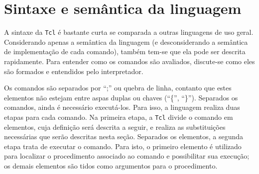 

\section{Sintaxe e semântica da linguagem}

A sintaxe da \texttt{Tcl} é bastante curta se comparada a outras linguagens
de uso geral. Considerando apenas a semântica da linguagem (e
desconsiderando a semântica de implementação de cada comando), também
tem-se que ela pode ser descrita rapidamente. Para entender como os
comandos são avaliados, discute-se como eles são
formados e entendidos pelo interpretador.


Os comandos são separados por ``;'' ou quebra de linha, contanto que
estes elementos não estejam entre aspas duplas ou chaves (``\{'',
``\}''). Separados os comandos, ainda é necessário executá-los. Para
isso, a linguagem realiza duas etapas para cada comando. Na primeira
etapa, a \texttt{Tcl} divide o comando em elementos, cuja definição será
descrita a seguir, e realiza as substituições necessárias que serão
descritas nesta seção. Separados os elementos, a segunda etapa trata de
executar o comando. Para isto, o primeiro elemento é utilizado
para localizar o procedimento associado ao comando e possibilitar sua
execução; os demais elementos são tidos como argumentos para o
procedimento.

